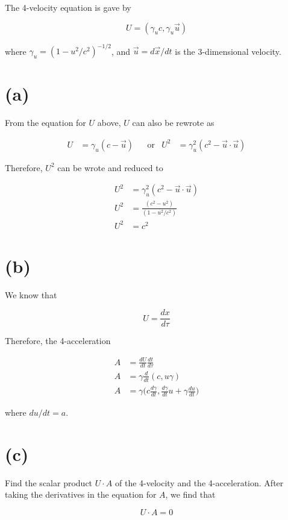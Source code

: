 \documentclass[11pt]{article}
\begin{document}
The 4-velocity equation is gave by

$$
U = (\gamma_{u}c, \gamma_{u}\vec{u})
$$

where $\gamma_{u} = (1 - u^{2}/c^{2})^{-1/2}$, and $\vec{u} = d\vec{x}/dt$ is the 3-dimensional velocity.

\section*{(a)}

From the equation for $U$ above, $U$ can also be rewrote as

\begin{align*}
U &= \gamma_{u} (c - \vec{u}) && \text{or} & U^{2} &= \gamma_{u}^{2} (c^{2} - \vec{u} \cdot \vec{u})
\end{align*}

Therefore, $U^{2}$ can be wrote and reduced to

\begin{align*}
U^{2} &= \gamma_{u}^{2} (c^{2} - \vec{u} \cdot \vec{u}) \\
U^{2} &= \frac{(c^{2} - u^{2})}{(1 - u^{2}/c^{2})} \\
U^{2} &= c^{2}
\end{align*}

\section*{(b)}

We know that

$$
U = \frac{dx}{d \tau} 
$$

Therefore, the 4-acceleration 

\begin{align*}
A &= \frac{dU}{dt} \frac{dt}{d \tau} \\
A &= \gamma \frac{d}{dt} (c, u \gamma )\\
A &= \gamma \Bigg(c \frac{d \gamma}{dt}, \frac{d \gamma}{dt}u + \gamma \frac{du}{dt}\Bigg)
\end{align*}

where $du/dt = a$.

\section*{(c)}


Find the scalar product $U \cdot A$ of the 4-velocity and the 4-acceleration. After taking the derivatives in the equation for $A$, we find that

$$
U \cdot A = 0
$$
\end{document}
